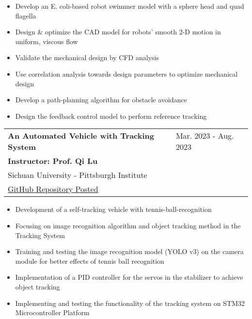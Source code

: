 \documentclass[letter,12pt]{article}
\begin{document}
\begin{itemize}[
    rightmargin=2cm
]
    \setlength{\itemsep}{1pt}
    \setlength{\parskip}{0pt}
    \setlength{\parsep}{0pt}
    \item{\small Develop an E. coli-based robot swimmer model with a sphere head and quad flagella}
    \item{\small Design \& optimize the CAD model for robots’ smooth 2-D motion in uniform, viscous flow}
    \item{\small Validate the mechanical design by CFD analysis}
    \item{\small Use correlation analysis towards design parameters to optimize mechanical design}
    \item{\small Develop a path-planning algorithm for obstacle avoidance}
    \item{\small Design the feedback control model to perform reference tracking}
    
\end{itemize}

\begin{tabularx}{\linewidth}{@{}l X@{}}
\large \textbf{An Automated Vehicle with Tracking System} & \hfill Mar. 2023 - Aug. 2023 \\
\small \textbf{Instructor: Prof. Qi Lu} & \hfill {} \\
\small{{Sichuan University - Pittsburgh Institute}} & \hfill {} \\
\small{\href{https://github.com/Robin0265/StablerCTRL}{GitHub Repository Posted}} & \hfill {} \\
\end{tabularx}

\begin{itemize}[
    rightmargin=2cm
]
    \setlength{\itemsep}{1pt}
    \setlength{\parskip}{0pt}
    \setlength{\parsep}{0pt}
    \item{\small Development of a self-tracking vehicle with tennis-ball-recognition}
    \item{\small Focusing on image recognition algorithm and object tracking method in the Tracking System}
    \item{\small Training and testing the image recognition model (YOLO v3) on the camera module for better effects of tennis ball recognition}
    \item{\small Implementation of a PID controller for the servos in the stabilizer to achieve object tracking}
    \item{\small Implementing and testing the functionality of the tracking system on STM32 Microcontroller Platform}
\end{itemize}
\end{document}
